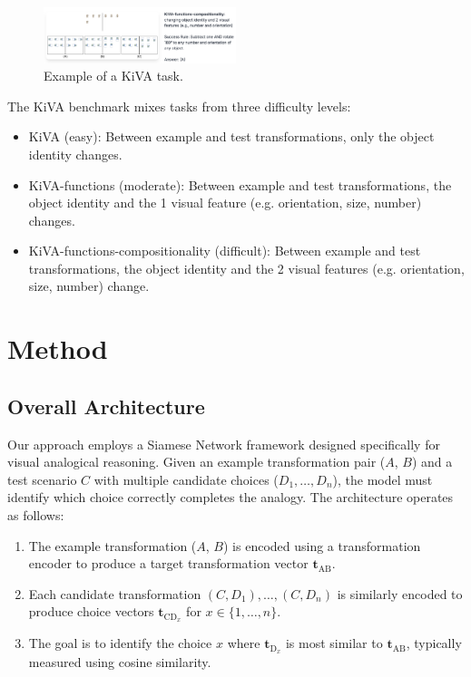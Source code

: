 \documentclass[twocolumn]{article} %
\begin{document}
\begin{figure}[h]
    \centering
    \includegraphics[width=0.5\textwidth]{figures/kiva-example.png}
    \caption{Example of a KiVA task.}
    \label{fig:kiva_example}
\end{figure}

The KiVA benchmark mixes tasks from three difficulty levels: 
\begin{itemize}
    \item KiVA (easy): Between example and test transformations, only the object identity changes.
    \item KiVA-functions (moderate): Between example and test transformations, the object identity and the 1 visual feature (e.g. orientation, size, number) changes.
    \item KiVA-functions-compositionality (difficult): Between example and test transformations, the object identity and the 2 visual features (e.g. orientation, size, number) change.
\end{itemize}

\section{Method}

\subsection{Overall Architecture}


Our approach employs a Siamese Network framework designed specifically for visual analogical reasoning. Given an example transformation pair ($A$, $B$) and a test scenario $C$ with multiple candidate choices ($D_1, \dots, D_n$), the model must identify which choice correctly completes the analogy. The architecture operates as follows:
\begin{enumerate}
    \item The example transformation ($A$, $B$) is encoded using a transformation encoder to produce a target transformation vector $\mathbf{t}_{\mathrm{AB}}$.
    \item Each candidate transformation $(C, D_1), \ldots, (C, D_n)$ is similarly encoded to produce choice vectors $\mathbf{t}_{\mathrm{CD}_x}$ for $x \in \{1, \ldots, n\}$.
    \item The goal is to identify the choice $x$ where $\mathbf{t}_{\mathrm{D}_x}$ is most similar to $\mathbf{t}_{\mathrm{AB}}$, typically measured using cosine similarity.
\end{enumerate}
\end{document}
